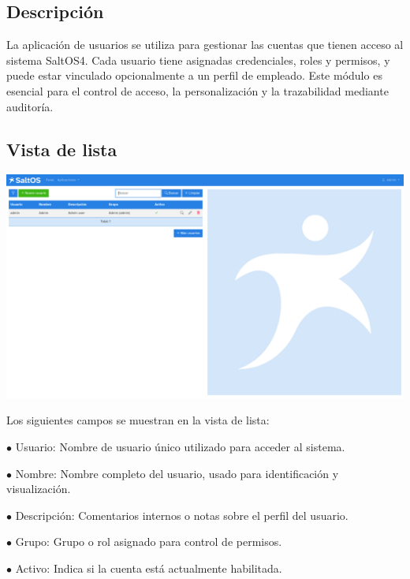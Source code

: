\documentclass[a4paper]{article}
\begin{document}
\hypertarget{toc182}{}
\subsection{Descripción}

La aplicación de usuarios se utiliza para gestionar las cuentas que tienen acceso al sistema SaltOS4.
Cada usuario tiene asignadas credenciales, roles y permisos, y puede estar vinculado opcionalmente a un perfil de empleado.
Este módulo es esencial para el control de acceso, la personalización y la trazabilidad mediante auditoría.

\hypertarget{toc183}{}
\subsection{Vista de lista}

\begin{center}\includegraphics[width=1\textwidth]{../ujest/snaps/test-screenshots-js-screenshots-users-users-list-es-es-1-snap.png}\end{center}

Los siguientes campos se muestran en la vista de lista:

\begin{compactitem}
\item[\color{myblue}$\bullet$] Usuario: Nombre de usuario único utilizado para acceder al sistema.
\item[\color{myblue}$\bullet$] Nombre: Nombre completo del usuario, usado para identificación y visualización.
\item[\color{myblue}$\bullet$] Descripción: Comentarios internos o notas sobre el perfil del usuario.
\item[\color{myblue}$\bullet$] Grupo: Grupo o rol asignado para control de permisos.
\item[\color{myblue}$\bullet$] Activo: Indica si la cuenta está actualmente habilitada.
\end{compactitem}
\end{document}
